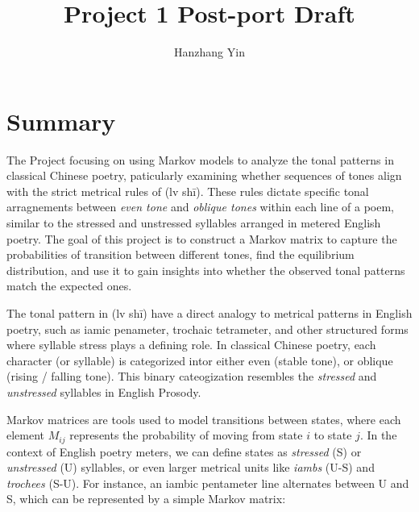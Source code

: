 \documentclass[12pt]{article}
\title{\vspace{-2cm}Project 1 Post-port Draft}
\author{Hanzhang Yin}
\begin{document}
\maketitle

\section{Summary}

The Project focusing on using Markov models to analyze the tonal patterns in classical Chinese poetry, paticularly examining whether sequences of tones align with the strict metrical rules of 
(lv shī). These rules dictate specific tonal arragnements between \textit{even tone} and \textit{oblique tones} within each line of a poem, similar to the stressed and unstressed syllables arranged in metered English
poetry. The goal of this project is to construct a Markov matrix to capture the probabilities of transition between different tones, find the equilibrium distribution, and use it to gain 
insights into whether the observed tonal patterns match the expected ones.

The tonal pattern in (lv shī) have a direct analogy to metrical patterns in English poetry, such as iamic penameter, trochaic tetrameter, and other structured forms where syllable stress plays a defining role.
In classical Chinese poetry, each character (or syllable) is categorized intor either even (stable tone), or oblique (rising / falling tone). This binary cateogization resembles the \textit{stressed} and \textit{unstressed} syllables 
in English Prosody.


Markov matrices are tools used to model transitions between states, where each element \( M_{ij} \) represents the probability of moving from state \( i \) to state \( j \). 
In the context of English poetry meters, we can define states as \textit{stressed} (S) or \textit{unstressed} (U) syllables, or even larger metrical units like \textit{iambs} (U-S) and \textit{trochees} (S-U). 
For instance, an iambic pentameter line alternates between U and S, which can be represented by a simple Markov matrix: 
\end{document}
